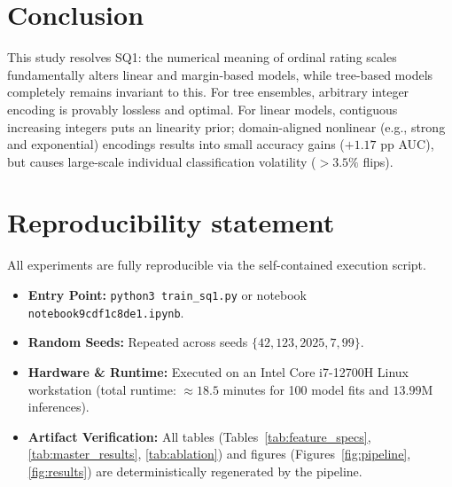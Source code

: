 \documentclass[10pt,a4paper]{article}
\begin{document}
\section{Conclusion}
This study resolves SQ1: the numerical meaning of ordinal rating scales fundamentally alters linear and margin-based models, while tree-based models completely remains invariant to this. For tree ensembles, arbitrary integer encoding is provably lossless and optimal. For linear models, contiguous increasing integers puts an linearity prior; domain-aligned nonlinear (e.g., strong and exponential) encodings results into small accuracy gains ($+1.17$ pp AUC), but causes large-scale individual classification volatility ($>3.5\%$ flips).

\section*{Reproducibility statement}
All experiments are fully reproducible via the self-contained execution script. 
\begin{itemize}[leftmargin=1.2em]
    \item \textbf{Entry Point:} \texttt{python3 train\_sq1.py} or notebook \texttt{notebook9cdf1c8de1.ipynb}.
    \item \textbf{Random Seeds:} Repeated across seeds $\{42, 123, 2025, 7, 99\}$.
    \item \textbf{Hardware \& Runtime:} Executed on an Intel Core i7-12700H Linux workstation (total runtime: $\approx 18.5$ minutes for 100 model fits and $13.99\text{M}$ inferences).
    \item \textbf{Artifact Verification:} All tables (Tables~\ref{tab:feature_specs}, \ref{tab:master_results}, \ref{tab:ablation}) and figures (Figures~\ref{fig:pipeline}, \ref{fig:results}) are deterministically regenerated by the pipeline.
\end{itemize}

\clearpage
\end{document}
